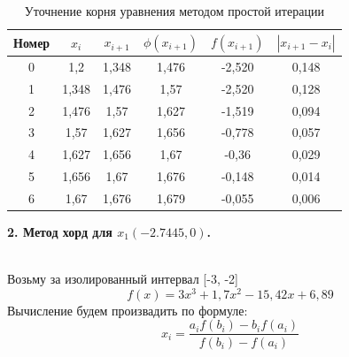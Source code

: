 \documentclass{article}
\begin{document}
\begin{table}[h]
    \centering
    \begin{tabular}{|*{6}{c|}}
        \hline
        Номер & $x_i$ & $x_{i+1}$ & $\phi(x_{i+1})$& $f(x_{i+1})$& $|x_{i+1} - x_i|$  \\
        \hline
        0& 1,2& 1,348& 1,476&-2,520& 0,148\\
        \hline
        1& 1,348& 1,476& 1,57& -2,520& 0,128\\
        \hline
        2& 1,476& 1,57& 1,627&-1,519& 0,094\\
        \hline
        3& 1,57& 1,627& 1,656& -0,778&0,057\\
        \hline
        4& 1,627& 1,656& 1,67& -0,36& 0,029\\
        \hline
        5& 1,656& 1,67& 1,676& -0,148& 0,014\\
        \hline
        6& 1,67& 1,676& 1,679& -0,055& 0,006\\
        \hline
    \end{tabular}
    \caption{Уточнение корня уравнения методом простой итерации}
\end{table}
\textbf{2. Метод хорд для $x_1(-2.7445,0)$.}
\\ \\
\begin{center}
\end{center}
Возьму за изолированный интервал [-3, -2]
\[
    f(x) = 3x^3+1,7x^2-15,42x+6,89\]
Вычисление будем произвадить по формуле:
\[
    x_i = \frac{a_if(b_i) - b_if(a_i)}{f(b_i) - f(a_i)}\]
\end{document}
